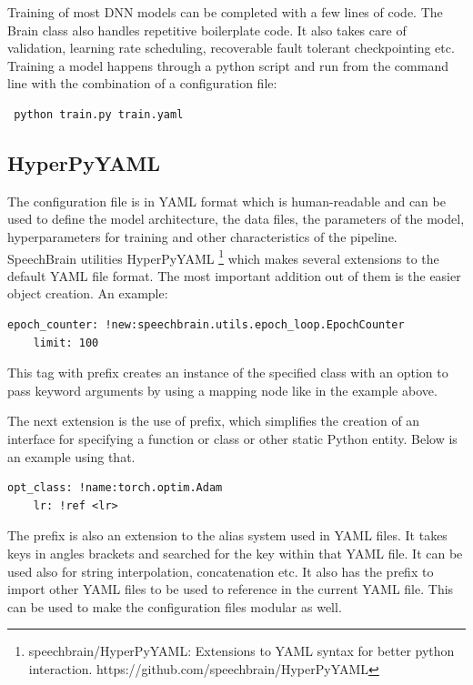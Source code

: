 Training of most DNN models can be completed with a few lines of code. The Brain class also handles repetitive boilerplate code. It also takes care of validation, learning rate scheduling, recoverable fault tolerant checkpointing etc. Training a model happens through a python script and run from the command line with the combination of a configuration file: 
\begin{verbatim} python train.py train.yaml\end{verbatim}

\subsection{HyperPyYAML}
The configuration file is in YAML format which is human-readable and can be used to define the model architecture, the data files, the parameters of the model, hyperparameters for training and other characteristics of the pipeline. SpeechBrain utilities HyperPyYAML \footnote{speechbrain/HyperPyYAML:  Extensions  to  YAML  syntax  for  better python interaction. https://github.com/speechbrain/HyperPyYAML} which makes several extensions to the default YAML file format. The most important addition out of them is the easier object creation. An example:

\begin{verbatim}
epoch_counter: !new:speechbrain.utils.epoch_loop.EpochCounter
    limit: 100
\end{verbatim}

This tag with prefix  creates an instance of the specified class with an option to pass keyword arguments by using a mapping node like in the example above.

The next extension is the use of prefix,  which simplifies the creation of an interface for specifying a function or class or other static Python entity. Below is an example using that.
\begin{verbatim}
opt_class: !name:torch.optim.Adam
    lr: !ref <lr>
\end{verbatim}
The prefix  is also an extension to the alias system used in YAML files. It takes keys in angles brackets and searched for the key within that YAML file. It can be used also for string interpolation, concatenation etc. It also has the  prefix to import other YAML files to be used to reference in the current YAML file. This can be used to make the configuration files modular as well. 

